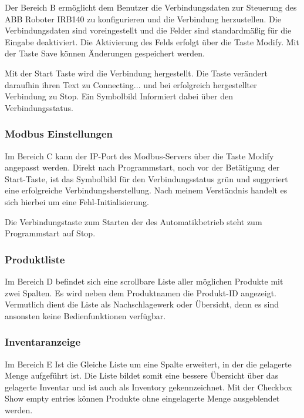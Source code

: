 Der Bereich \glqq B\grqq{} ermöglicht dem Benutzer die Verbindungsdaten zur Steuerung des ABB Roboter IRB140 zu
konfigurieren und die Verbindung herzustellen. 
Die Verbindungsdaten sind voreingestellt und die Felder sind standardmäßig für die Eingabe deaktiviert. 
Die Aktivierung des Felds erfolgt über die Taste \glqq Modify\grqq{}.
Mit der Taste \glqq Save\grqq{} können Änderungen gespeichert werden.

Mit der \glqq Start\grqq{} Taste wird die Verbindung hergestellt.
Die Taste verändert daraufhin ihren Text zu \glqq Connecting...\grqq{} und bei erfolgreich hergestellter Verbindung
zu \glqq Stop\grqq{}.
Ein Symbolbild Informiert dabei über den Verbindungsstatus.

\subsubsection{Modbus Einstellungen}
Im Bereich \glqq C\grqq{} kann der IP-Port des Modbus-Servers über die Taste \glqq Modify\grqq{} angepasst werden.
Direkt nach Programmstart, noch vor der Betätigung der Start-Taste, ist das Symbolbild für den Verbindungsstatus grün
und suggeriert eine erfolgreiche Verbindungsherstellung. 
Nach meinem Verständnis handelt es sich hierbei um eine Fehl-Initialisierung.

Die Verbindungstaste zum Starten der des Automatikbetrieb steht zum Programmstart auf \glqq Stop\grqq{}.

\subsubsection{Produktliste}
Im Bereich \glqq D\grqq{} befindet sich eine scrollbare Liste aller möglichen Produkte mit zwei Spalten.
Es wird neben dem Produktnamen die Produkt-ID angezeigt.
Vermutlich dient die Liste als Nachschlagewerk oder Übersicht, denn es sind ansonsten keine Bedienfunktionen verfügbar.

\subsubsection{Inventaranzeige}
Im Bereich \glqq E\grqq{} Ist die Gleiche Liste um eine Spalte erweitert, in der die gelagerte Menge aufgeführt ist.
Die Liste bildet somit eine bessere Übersicht über das gelagerte Inventar und ist auch als \glqq Inventory\grqq{} gekennzeichnet.
Mit der Checkbox \glqq Show empty entries\grqq{} können Produkte ohne eingelagerte Menge ausgeblendet werden.

